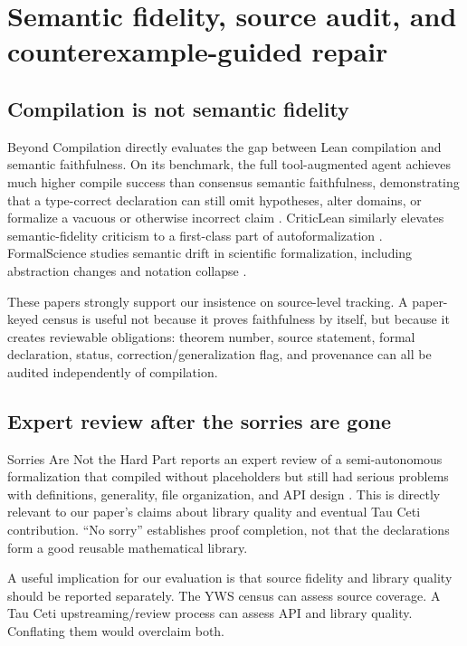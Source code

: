 \documentclass[11pt]{article}
\newcommand{\TauCeti}{Tau Ceti}
\begin{document}
\section{Semantic fidelity, source audit, and counterexample-guided repair}
\label{sec:fidelity}

\subsection{Compilation is not semantic fidelity}

Beyond Compilation directly evaluates the gap between Lean compilation and
semantic faithfulness.  On its benchmark, the full tool-augmented agent achieves
much higher compile success than consensus semantic faithfulness, demonstrating
that a type-correct declaration can still omit hypotheses, alter domains, or
formalize a vacuous or otherwise incorrect claim \citep{zhang2026beyondcompilation}.
CriticLean similarly elevates semantic-fidelity criticism to a first-class part
of autoformalization \citep{peng2025criticlean}.  FormalScience studies semantic
drift in scientific formalization, including abstraction changes and notation
collapse \citep{meadows2026formalscience}.

These papers strongly support our insistence on source-level tracking.  A
paper-keyed census is useful not because it proves faithfulness by itself, but
because it creates reviewable obligations: theorem number, source statement,
formal declaration, status, correction/generalization flag, and provenance can
all be audited independently of compilation.

\subsection{Expert review after the sorries are gone}

Sorries Are Not the Hard Part reports an expert review of a semi-autonomous
formalization that compiled without placeholders but still had serious problems
with definitions, generality, file organization, and API design
\citep{ilin2026sorries}.  This is directly relevant to our paper's claims about
library quality and eventual \TauCeti{} contribution.  ``No sorry'' establishes
proof completion, not that the declarations form a good reusable mathematical
library.

A useful implication for our evaluation is that source fidelity and library
quality should be reported separately.  The YWS census can assess source
coverage.  A \TauCeti{} upstreaming/review process can assess API and library
quality.  Conflating them would overclaim both.
\end{document}
